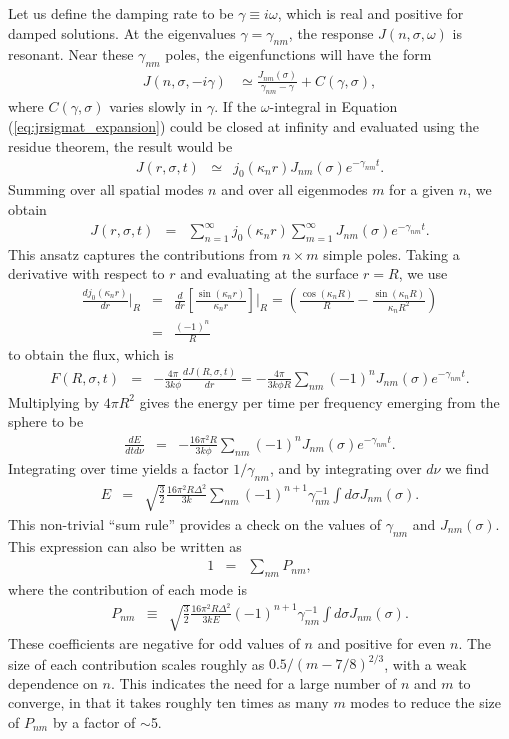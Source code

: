 \documentclass[linenumbers]{aastex63}
\newcommand{\be}{\begin{eqnarray}}
\newcommand{\ee}{\end{eqnarray}}
\begin{document}
Let us define the damping rate to be $\gamma \equiv i\omega$, which is real and positive for damped solutions. At the eigenvalues $\gamma=\gamma_{nm}$, the response $J(n, \sigma, \omega)$ is resonant. Near these $\gamma_{nm}$ poles, the eigenfunctions will have the form 
\be \label{eq:jnsigmaomega_approx}
J(n,\sigma,-i\gamma) & \simeq \frac{ J_{nm}(\sigma) }{\gamma_{nm} - \gamma} + C(\gamma, \sigma),
\ee
where $C(\gamma, \sigma)$ varies slowly in $\gamma$. If the $\omega$-integral in Equation (\ref{eq:jrsigmat_expansion}) could be closed at infinity and evaluated using the residue theorem, the result would be
\be
J(r,\sigma,t) & \simeq & j_0(\kappa_n r) J_{nm}(\sigma) e^{-\gamma_{nm}t}.
\ee
Summing over all spatial modes $n$ and over all eigenmodes $m$ for a given $n$, we obtain
\be \label{eq:Jrsigmat}
J(r,\sigma,t) & = & \sum_{n=1}^\infty j_0(\kappa_n r)  \sum_{m=1}^{\infty} J_{nm}(\sigma) e^{-\gamma_{nm}t}.
\ee
This ansatz captures the contributions from $n \times m$ simple poles. Taking a derivative with respect to $r$ and evaluating at the surface $r=R$, we use
\be
\frac{dj_0(\kappa_n r)}{dr} \bigg\rvert_R & =& \frac{d}{dr} \left[ \frac{\sin(\kappa_n r)}{\kappa_n r} \right]\bigg\rvert_R
=  \left( \frac{\cos(\kappa_n R)}{R} - \frac{\sin(\kappa_n R)}{\kappa_n R^2} \right)
\nonumber \\ & = & \frac{(-1)^n}{R}
\ee
to obtain the flux, which is
\be
F(R,\sigma,t) & =& - \frac{4\pi}{3k\phi} \frac{dJ(R,\sigma,t)}{dr} 
= - \frac{4\pi}{3k\phi R}  \sum_{nm} (-1)^n J_{nm}(\sigma) e^{-\gamma_{nm}t}.
\ee
Multiplying by $4\pi R^2$ gives the energy per time per frequency emerging from the sphere to be
\be
\frac{dE}{dtd\nu} & = & - \frac{16\pi^2 R}{3k\phi}  \sum_{nm} (-1)^n J_{nm}(\sigma) e^{-\gamma_{nm}t}.
\label{eq:dEdtdnu}
\ee
Integrating over time yields a factor $1/\gamma_{nm}$, and by integrating over $d\nu$ we find
\be \label{eq:sum_rule}
E & = &  \sqrt{ \frac{3}{2} } \frac{16\pi^2R\Delta^2}{3k} \sum_{nm} (-1)^{n+1} \gamma_{nm}^{-1} \int d\sigma J_{nm}(\sigma).
\ee
This non-trivial ``sum rule'' provides a check on the values of $\gamma_{nm}$ and $J_{nm}(\sigma)$. This expression can also be written as
\be
1 & =& \sum_{nm} P_{nm},
\label{eq:sumrule}
\ee
where the contribution of each mode is
\be \label{eq:pnmsoln}
P_{nm} & \equiv & \sqrt{ \frac{3}{2} } \frac{16\pi^2R\Delta^2}{3kE}  (-1)^{n+1} \gamma_{nm}^{-1} \int d\sigma J_{nm}(\sigma).
\ee
These coefficients are negative for odd values of $n$ and positive for even $n$. The size of each contribution scales roughly as $0.5/(m-7/8)^{2/3}$, with a weak dependence on $n$. This indicates the need for a large number of $n$ and $m$ to converge, in that it takes roughly ten times as many $m$ modes to reduce the size of $P_{nm}$ by a factor of ${\sim}$5. 
\end{document}
